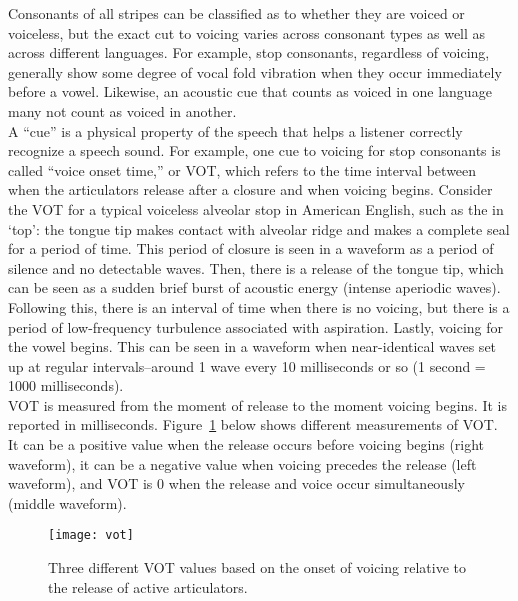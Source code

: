 \documentclass[lab={2},title={Voice Onset Time}]{com310lab}
\begin{document}
\maketitle

\begin{overview}
	Consonants of all stripes can be classified as to whether they are voiced or voiceless, but the exact cut to voicing varies across consonant types as well as across different languages.
	For example, stop consonants, regardless of voicing, generally show some degree of vocal fold vibration when they occur immediately before a vowel.
	Likewise, an acoustic cue that counts as voiced in one language many not count as voiced in another.\\

	A ``cue'' is a physical property of the speech that helps a listener correctly recognize a speech sound.
	For example, one cue to voicing for stop consonants is called ``voice onset time,'' or VOT, which refers to the time interval between when the articulators release after a closure and when voicing begins.
	Consider the VOT for a typical voiceless alveolar stop in American English, such as the  in `top':
	the tongue tip makes contact with alveolar ridge and makes a complete seal for a period of time.
	This period of closure is seen in a waveform as a period of silence and no detectable waves.
	Then, there is a release of the tongue tip, which can be seen as a sudden brief burst of acoustic energy (intense aperiodic waves).
	Following this, there is an interval of time when there is no voicing, but there is a period of low-frequency turbulence associated with aspiration.
	Lastly, voicing for the vowel begins.
	This can be seen in a waveform when near-identical waves set up at regular intervals--around 1 wave every 10 milliseconds or so (1 second = 1000 milliseconds).\\

	VOT is measured from the moment of release to the moment voicing begins.
	It is reported in milliseconds.
	Figure~\ref{fig:vot} below shows different measurements of VOT\@.
	It can be a positive value when the release occurs before voicing begins (right waveform),
	it can be a negative value when voicing precedes the release (left waveform), and VOT is 0 when the release and voice occur simultaneously (middle waveform).

	\begin{figure}[H]
		\centering
		\texttt{[image: vot]}
		\caption{Three different VOT values based on the onset of voicing relative to the release of active articulators.}
		\label{fig:vot}
	\end{figure}~
\end{overview}
\end{document}
